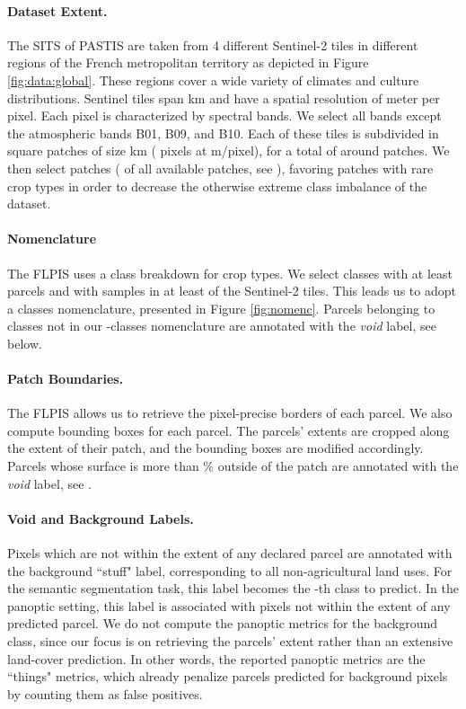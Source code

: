 \paragraph{Dataset Extent.} 
The SITS of PASTIS are taken from 4 different Sentinel-2 tiles in different regions of the French metropolitan territory as depicted in Figure \ref{fig:data:global}. These regions cover a wide variety of climates and culture distributions.
Sentinel tiles span km and have a spatial resolution of  meter per pixel. Each pixel is characterized by  spectral bands. We select all bands except the atmospheric bands B01, B09, and B10.
Each of these tiles is subdivided in square patches of size km ( pixels at m/pixel), for a total of around  patches.
We then select  patches ( of all available patches, see ), favoring patches with rare crop types in order to decrease the otherwise extreme class imbalance of the dataset.



\paragraph{Nomenclature} 
The FLPIS uses a  class breakdown for crop types. 
We select classes with at least  parcels and with samples in at least  of the  Sentinel-2 tiles. This leads us to adopt a  classes nomenclature, presented in Figure \ref{fig:nomenc}.
Parcels belonging to classes not in our -classes nomenclature are annotated with the \emph{void} label, see below.

\paragraph{Patch Boundaries.}
The FLPIS allows us to retrieve the pixel-precise borders of each parcel. We also compute bounding boxes for each parcel.
The parcels' extents are cropped along the extent of their  patch, and the bounding boxes are modified accordingly.
Parcels whose surface is more than \% outside of the patch are annotated with the \emph{void} label, see .


\paragraph{Void and Background Labels.} Pixels which are not within the extent of any declared parcel are annotated with the background ``stuff" label, corresponding to all non-agricultural land uses. For the semantic segmentation task, this label becomes the -th class to predict. In the panoptic setting, this label is associated with pixels not within the extent of any predicted parcel. 
We do not compute the panoptic metrics for the background class, since our focus is on retrieving the parcels' extent rather than an extensive land-cover prediction. In other words, the reported panoptic metrics are the ``things" metrics, which already penalize parcels predicted for background pixels by counting them as false positives.


